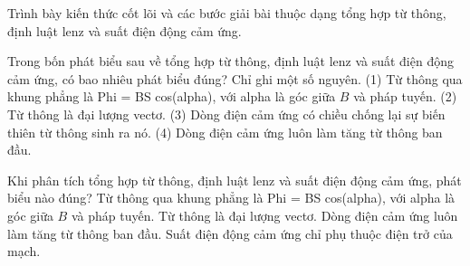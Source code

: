 \begin{bt}
Trình bày kiến thức cốt lõi và các bước giải bài thuộc dạng tổng hợp từ thông, định luật lenz và suất điện động cảm ứng.
\end{bt}

\begin{ex}
Trong bốn phát biểu sau về tổng hợp từ thông, định luật lenz và suất điện động cảm ứng, có bao nhiêu phát biểu đúng? Chỉ ghi một số nguyên. (1) Từ thông qua khung phẳng là Phi = BS cos(alpha), với alpha là góc giữa $B$ và pháp tuyến. (2) Từ thông là đại lượng vectơ. (3) Dòng điện cảm ứng có chiều chống lại sự biến thiên từ thông sinh ra nó. (4) Dòng điện cảm ứng luôn làm tăng từ thông ban đầu.
\end{ex}

\begin{ex}
Khi phân tích tổng hợp từ thông, định luật lenz và suất điện động cảm ứng, phát biểu nào đúng?
\choice
{\True Từ thông qua khung phẳng là Phi = BS cos(alpha), với alpha là góc giữa $B$ và pháp tuyến.}
{Từ thông là đại lượng vectơ.}
{Dòng điện cảm ứng luôn làm tăng từ thông ban đầu.}
{Suất điện động cảm ứng chỉ phụ thuộc điện trở của mạch.}
\end{ex}

